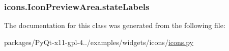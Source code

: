 \subsubsection[{state\+Labels}]{\setlength{\rightskip}{0pt plus 5cm}icons.\+Icon\+Preview\+Area.\+state\+Labels}\label{classicons_1_1IconPreviewArea_a48f15b24ebb61bd9ced171d72504494a}


The documentation for this class was generated from the following file\+:\begin{DoxyCompactItemize}
\item 
packages/\+Py\+Qt-\/x11-\/gpl-\/4../examples/widgets/icons/\hyperlink{icons_8py}{icons.\+py}\end{DoxyCompactItemize}

